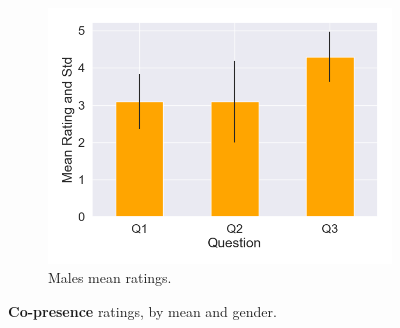 \begin{figure}[H]
 \begin{subfigure}[b]{0.3\textwidth}
 \centering
 \includegraphics[scale=0.33]{Files/Plots/copresence_mean_m.png}
 \caption{Males mean ratings.}
 \label{fig:copresMale}
 \end{subfigure}
 \caption{\textbf{Co-presence} ratings, by mean and gender.}
\label{fig:coAll}
\end{figure}

